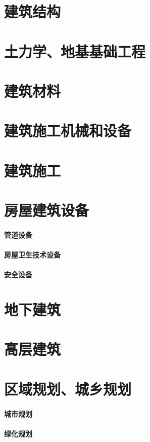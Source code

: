 \documentclass[UTF8]{../../ApplicationUniverse}
\begin{document}
\chapter{建筑结构}
\chapter{土力学、地基基础工程}
\chapter{建筑材料}
\chapter{建筑施工机械和设备}
\chapter{建筑施工}
\chapter{房屋建筑设备}
    \subsubsection{管道设备}
    \subsubsection{房屋卫生技术设备}
    \subsubsection{安全设备}




\chapter{地下建筑}
\chapter{高层建筑}
\chapter{区域规划、城乡规划}
\subsubsection{城市规划}
\subsubsection{绿化规划}
\end{document}
